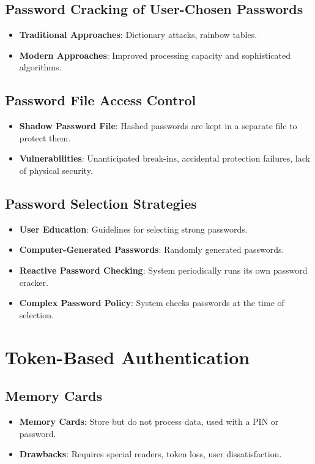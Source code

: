 \documentclass{article}
\begin{document}
\subsection{Password Cracking of User-Chosen Passwords}
\begin{itemize}
    \item \textbf{Traditional Approaches}: Dictionary attacks, rainbow tables.
    \item \textbf{Modern Approaches}: Improved processing capacity and sophisticated algorithms.
\end{itemize}

\subsection{Password File Access Control}
\begin{itemize}
    \item \textbf{Shadow Password File}: Hashed passwords are kept in a separate file to protect them.
    \item \textbf{Vulnerabilities}: Unanticipated break-ins, accidental protection failures, lack of physical security.
\end{itemize}

\subsection{Password Selection Strategies}
\begin{itemize}
    \item \textbf{User Education}: Guidelines for selecting strong passwords.
    \item \textbf{Computer-Generated Passwords}: Randomly generated passwords.
    \item \textbf{Reactive Password Checking}: System periodically runs its own password cracker.
    \item \textbf{Complex Password Policy}: System checks passwords at the time of selection.
\end{itemize}

\section{Token-Based Authentication}
\subsection{Memory Cards}
\begin{itemize}
    \item \textbf{Memory Cards}: Store but do not process data, used with a PIN or password.
    \item \textbf{Drawbacks}: Requires special readers, token loss, user dissatisfaction.
\end{itemize}
\end{document}
